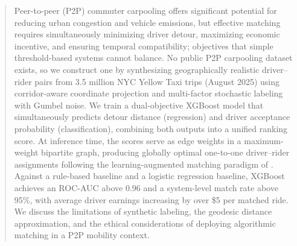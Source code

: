 \documentclass{article}
\begin{document}

\printAffiliationsAndNotice{}


\begin{abstract}
Peer-to-peer (P2P) commuter carpooling offers significant potential for reducing urban congestion and vehicle emissions, but effective matching requires simultaneously minimizing driver detour, maximizing economic incentive, and ensuring temporal compatibility; objectives that simple threshold-based systems cannot balance. No public P2P carpooling dataset exists, so we construct one by synthesizing geographically realistic driver--rider pairs from 3.5 million NYC Yellow Taxi trips (August 2025) using corridor-aware coordinate projection and multi-factor stochastic labeling with Gumbel noise. We train a dual-objective XGBoost model that simultaneously predicts detour distance (regression) and driver acceptance probability (classification), combining both outputs into a unified ranking score. At inference time, the scores serve as edge weights in a maximum-weight bipartite graph, producing globally optimal one-to-one driver--rider assignments following the learning-augmented matching paradigm of \citet{bjorck2021learning}. Against a rule-based baseline and a logistic regression baseline, XGBoost achieves an ROC-AUC above 0.96 and a system-level match rate above 95\%, with average driver earnings increasing by over \$5 per matched ride. We discuss the limitations of synthetic labeling, the geodesic distance approximation, and the ethical considerations of deploying algorithmic matching in a P2P mobility context.
\end{abstract}
\end{document}
